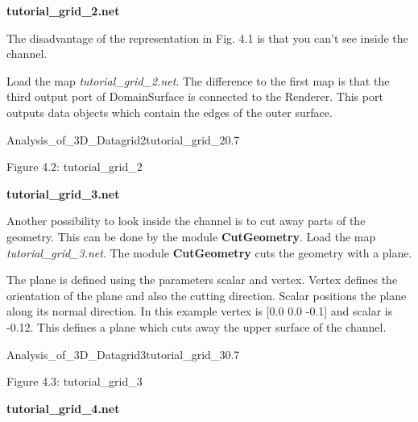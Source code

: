 \vspace{1cm}
\begin{Large}{\bf tutorial\_grid\_2.net}\end{Large}
\vspace{0.5cm}

The disadvantage of the representation in Fig. 4.1 is that you can't see inside the channel. 

Load the map {\it tutorial\_grid\_2.net}. The difference to the first map is that the 
third output port of DomainSurface is connected to the Renderer. This port outputs 
data objects which contain the edges of the outer surface.

\begin{covimg}{Analysis_of_3D_Data}{grid2}{tutorial\_grid\_2}{0.7}\end{covimg}
\begin{htmlonly}
Figure 4.2: tutorial_grid_2
\vspace{0.5cm}
\end{htmlonly}


\vspace{1cm}
\begin{Large}{\bf tutorial\_grid\_3.net}\end{Large}
\vspace{0.5cm}

Another possibility to look inside the channel is to cut away parts of the geometry. 
This can be done by the module {\bf CutGeometry}. Load the map 
{\it tutorial\_grid\_3.net}. The module {\bf CutGeometry} cuts the geometry with a plane. 

The plane is defined using the parameters scalar and vertex. Vertex defines the 
orientation of the plane and also the cutting direction. Scalar positions the plane 
along its normal direction. In this example vertex is [0.0 0.0 -0.1] and
scalar is -0.12. This defines a plane which cuts away the upper surface of the channel.

\begin{covimg}{Analysis_of_3D_Data}{grid3}{tutorial\_grid\_3}{0.7}\end{covimg}
\begin{htmlonly}
Figure 4.3: tutorial_grid_3
\vspace{1cm}
\end{htmlonly}


\vspace{1cm}
\begin{Large}{\bf tutorial\_grid\_4.net}\end{Large}
\vspace{0.5cm}


